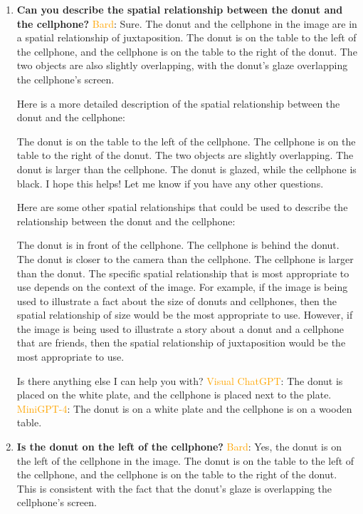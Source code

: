     \begin{enumerate}
        \item \textbf{Can you describe the spatial relationship between the donut and the cellphone?}
        \subitem \textcolor{orange}{Bard}: Sure. The donut and the cellphone in the image are in a spatial relationship of juxtaposition. The donut is on the table to the left of the cellphone, and the cellphone is on the table to the right of the donut. The two objects are also slightly overlapping, with the donut's glaze overlapping the cellphone's screen.

        Here is a more detailed description of the spatial relationship between the donut and the cellphone:
        
        The donut is on the table to the left of the cellphone.
        The cellphone is on the table to the right of the donut.
        The two objects are slightly overlapping.
        The donut is larger than the cellphone.
        The donut is glazed, while the cellphone is black.
        I hope this helps! Let me know if you have any other questions.
        
        Here are some other spatial relationships that could be used to describe the relationship between the donut and the cellphone:
        
        The donut is in front of the cellphone.
        The cellphone is behind the donut.
        The donut is closer to the camera than the cellphone.
        The cellphone is larger than the donut.
        The specific spatial relationship that is most appropriate to use depends on the context of the image. For example, if the image is being used to illustrate a fact about the size of donuts and cellphones, then the spatial relationship of size would be the most appropriate to use. However, if the image is being used to illustrate a story about a donut and a cellphone that are friends, then the spatial relationship of juxtaposition would be the most appropriate to use.
        
        Is there anything else I can help you with?
        \subitem \textcolor{orange}{Visual ChatGPT}: The donut is placed on the white plate, and the cellphone is placed next to the plate.
        \subitem \textcolor{orange}{MiniGPT-4}: The donut is on a white plate and the cellphone is on a wooden table.
        \item \textbf{Is the donut on the left of the cellphone?}
        \subitem \textcolor{orange}{Bard}: 
        Yes, the donut is on the left of the cellphone in the image. The donut is on the table to the left of the cellphone, and the cellphone is on the table to the right of the donut. This is consistent with the fact that the donut's glaze is overlapping the cellphone's screen.
        

\end{enumerate}
